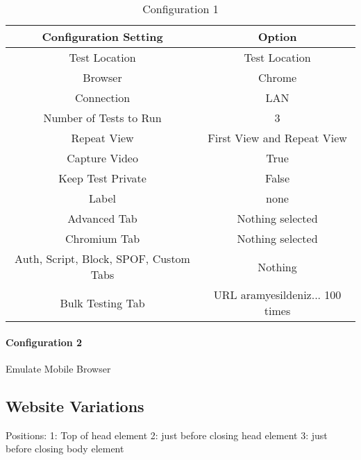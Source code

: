 \begin{table}[h]
	\caption[Test Runs]{Configuration 1}
	\label{tab:tamodelleVergleich}
	\centering
	\begin{tabular}{ |c|c| } 
	\hline
	Configuration Setting & Option \\
	\hline
	Test Location & Test Location \\ 
	Browser & Chrome \\
	\hline
	Connection & LAN \\
	Number of Tests to Run & 3 \\
	Repeat View & First View and Repeat View \\
	Capture Video & True \\
	Keep Test Private & False \\
	Label & none \\
	\hline	  
	Advanced Tab & Nothing selected \\
	Chromium Tab & Nothing selected  \\
	Auth, Script, Block, SPOF, Custom Tabs & Nothing  \\
	Bulk Testing Tab & URL aramyesildeniz... 100 times \\
	\hline
	\end{tabular}
\end{table}

\paragraph{Configuration 2}

Emulate Mobile Browser




\subsection{Website Variations}

Positions:
1: Top of head element
2: just before closing head element
3: just before closing body element

